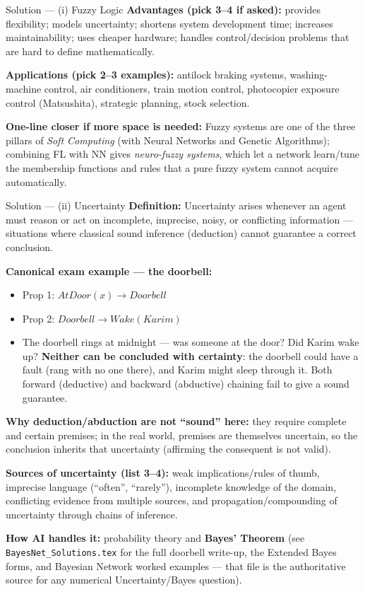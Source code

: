\documentclass[12pt,a4paper]{article}
\begin{document}
\begin{solbox}{Solution --- (i) Fuzzy Logic}
\textbf{Advantages (pick 3--4 if asked):} provides flexibility; models uncertainty; shortens system development time; increases maintainability; uses cheaper hardware; handles control/decision problems that are hard to define mathematically.

\textbf{Applications (pick 2--3 examples):} antilock braking systems, washing-machine control, air conditioners, train motion control, photocopier exposure control (Matsushita), strategic planning, stock selection.

\textbf{One-line closer if more space is needed:} Fuzzy systems are one of the three pillars of \emph{Soft Computing} (with Neural Networks and Genetic Algorithms); combining FL with NN gives \emph{neuro-fuzzy systems}, which let a network learn/tune the membership functions and rules that a pure fuzzy system cannot acquire automatically.
\end{solbox}

\begin{solbox}{Solution --- (ii) Uncertainty}
\textbf{Definition:} Uncertainty arises whenever an agent must reason or act on incomplete, imprecise, noisy, or conflicting information --- situations where classical sound inference (deduction) cannot guarantee a correct conclusion.

\textbf{Canonical exam example --- the doorbell:}
\begin{itemize}[noitemsep]
  \item Prop 1: $AtDoor(x) \to Doorbell$
  \item Prop 2: $Doorbell \to Wake(Karim)$
  \item The doorbell rings at midnight --- was someone at the door? Did Karim wake up? \textbf{Neither can be concluded with certainty}: the doorbell could have a fault (rang with no one there), and Karim might sleep through it. Both forward (deductive) and backward (abductive) chaining fail to give a sound guarantee.
\end{itemize}

\textbf{Why deduction/abduction are not ``sound'' here:} they require complete and certain premises; in the real world, premises are themselves uncertain, so the conclusion inherits that uncertainty (affirming the consequent is not valid).

\textbf{Sources of uncertainty (list 3--4):} weak implications/rules of thumb, imprecise language (``often'', ``rarely''), incomplete knowledge of the domain, conflicting evidence from multiple sources, and propagation/compounding of uncertainty through chains of inference.

\textbf{How AI handles it:} probability theory and \textbf{Bayes' Theorem} (see \texttt{BayesNet\_Solutions.tex} for the full doorbell write-up, the Extended Bayes forms, and Bayesian Network worked examples — that file is the authoritative source for any numerical Uncertainty/Bayes question).
\end{solbox}
\end{document}
